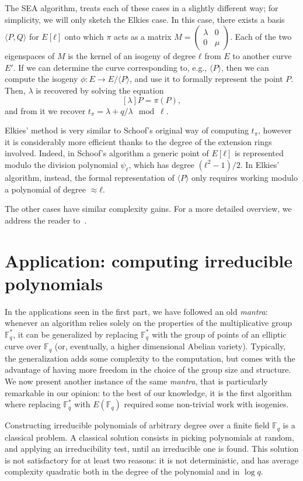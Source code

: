 \documentclass[10pt]{article}
\theoremstyle{plain}
\theoremstyle{definition}
\def\F{\ensuremath{\mathbb{F}}}
\begin{document}
The SEA algorithm, treats each of these cases in a slightly different
way; for simplicity, we will only sketch the Elkies case. %
In this case, there exists a basis $〈P,Q〉$ for $E[ℓ]$ onto which $π$
acts as a matrix
$M=\left(\begin{smallmatrix}λ&0\\0&μ\end{smallmatrix}\right)$. %
Each of the two eigenspaces of $M$ is the kernel of an isogeny of
degree $ℓ$ from $E$ to another curve $E'$. %
If we can determine the curve corresponding to, e.g., $〈P〉$, then we
can compute the isogeny $ϕ:E\to E/〈P〉$, and use it to formally
represent the point $P$. %
Then, $λ$ is recovered by solving the equation
\[[λ]P = π(P),\]
and from it we recover $t_π = λ + q/λ \mod \ell$.

Elkies' method is very similar to Schoof's original way of computing
$t_π$, however it is considerably more efficient thanks to the degree
of the extension rings involved. %
Indeed, in Schoof's algorithm a generic point of $E[ℓ]$ is represented
modulo the division polynomial $ψ_ℓ$, which has degree $(ℓ^2-1)/2$. %
In Elkies' algorithm, instead, the formal representation of $〈P〉$
only requires working modulo a polynomial of degree $≈ℓ$.

The other cases have similar complexity gains. %
For a more detailed overview, we address the reader
to~\cite{schoof95,lercier-algorithmique,elkies98,sutherland10}.


\section{Application: computing irreducible polynomials }

In the applications seen in the first part, we have followed an old
\emph{mantra}: whenever an algorithm relies solely on the properties
of the multiplicative group $\F_q^*$, it can be generalized by
replacing $\F_q^*$ with the group of points of an elliptic curve over
$\F_q$ (or, eventually, a higher dimensional Abelian variety). %
Typically, the generalization adds some complexity to the computation,
but comes with the advantage of having more freedom in the choice of
the group size and structure. %
We now present another instance of the same \emph{mantra}, that is
particularly remarkable in our opinion: to the best of our knowledge,
it is the first algorithm where replacing $\F_q^*$ with $E(\F_q)$
required some non-trivial work with isogenies.

Constructing irreducible polynomials of arbitrary degree over a finite
field $\F_q$ is a classical problem. %
A classical solution consists in picking polynomials at random, and
applying an irreducibility test, until an irreducible one is found. %
This solution is not satisfactory for at least two reasons: it is not
deterministic, and has average complexity quadratic both in the degree
of the polynomial and in $\log q$.
\end{document}
